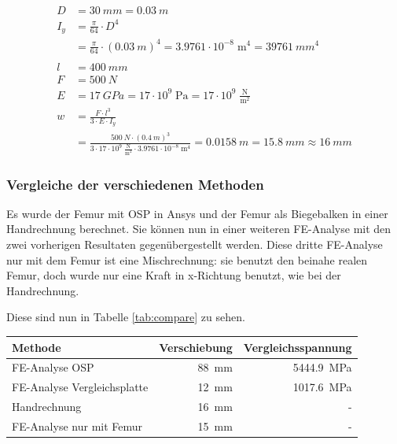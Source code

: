 		\begin{mycapequ}[!ht]
			\vspace{-10mm}
			\begin{align*}
				D   &= \SI{30}{mm} = \SI{0.03}{m} \\
				I_y &= \frac{\pi}{64} \cdot D^4 \\
				    &= \frac{\pi}{64} \cdot \left(\SI{0.03}{m}\right)^4 = 3.9761 \cdot 10^{-8} \; \mathrm{m^4} = \SI{39761}{mm^4} \\
				\\
				l   &= \SI{400}{mm} \\
				F   &= \SI{500}{N} \\
				E   &= \SI{17}{GPa} = 17 \cdot 10^{9} \; \mathrm{Pa}
				                    = 17 \cdot 10^{9} \; \mathrm{\frac{N}{m^2}}\\
				w   &= \frac{F \cdot l^3}{3 \cdot E \cdot I_y} \\
				    &= \frac{\SI{500}{N} \cdot \left(\SI{0.4}{m}\right)^3}
				            {3 \cdot 17 \cdot 10^{9} \; \mathrm{\frac{N}{m^2}} \cdot 3.9761 \cdot 10^{-8} \; \mathrm{m^4}}
				     = \SI{0.0158}{m} = \SI{15.8}{mm} \approx \SI{16}{mm}
			\end{align*}
		\end{mycapequ}
	
	
		\subsubsection{Vergleiche der verschiedenen Methoden}
		
			Es wurde der Femur mit OSP in Ansys und der Femur als Biegebalken in einer Handrechnung berechnet.
			Sie können nun in einer weiteren FE-Analyse mit den zwei vorherigen Resultaten gegenübergestellt werden.
			Diese dritte FE-Analyse nur mit dem Femur ist eine Mischrechnung: sie benutzt den beinahe realen Femur,
			doch wurde nur eine Kraft in x-Richtung benutzt, wie bei der Handrechnung.
			
			Diese sind nun in Tabelle \ref{tab:compare} zu sehen.
		
			\begin{center}
				\renewcommand{\arraystretch}{1.5}
				\begin{tabular}{ | p{6cm} | r | r | }
					\multicolumn{1}{l}{\bfseries Methode} &
					\multicolumn{1}{l}{\bfseries Verschiebung} &
					\multicolumn{1}{l}{\bfseries Vergleichsspannung}\\ \hline
					
					FE-Analyse OSP              & \SI{88}{mm} & \SI{5444.9}{MPa} \\ \hline
					FE-Analyse Vergleichsplatte & \SI{12}{mm} & \SI{1017.6}{MPa} \\ \hline
					Handrechnung                & \SI{16}{mm} & - \\ \hline
					FE-Analyse nur mit Femur    & \SI{15}{mm} & - \\ \hline
				\end{tabular}
				\label{tab:compare}
			\end{center}
			
